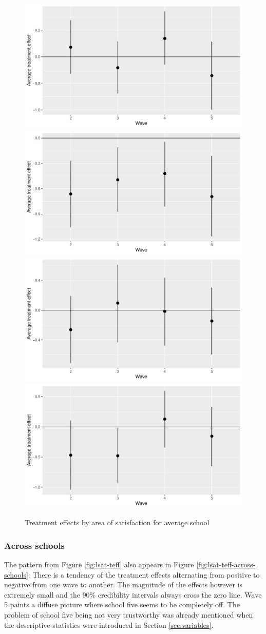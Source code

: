 \documentclass[a4, 12pt]{article}
\begin{document}
\begin{figure}
\includegraphics[width=0.5\linewidth]{../figures/lsat_teff} \includegraphics[width=0.5\linewidth]{../figures/sat_friends_teff} \includegraphics[width=0.5\linewidth]{../figures/sat_class_teff} \includegraphics[width=0.5\linewidth]{../figures/sat_school_teff} \caption{Treatment effects by area of satisfaction for average school}\label{fig:sat-teff}
\end{figure}

\hypertarget{across-schools}{%
\subsubsection{Across schools}\label{across-schools}}

The pattern from Figure \ref{fig:lsat-teff} also appears in Figure \ref{fig:lsat-teff-across-schools}: There is a tendency of the treatment effects alternating from positive to negative from one wave to another. The magnitude of the effects however is extremely small and the 90\% credibility intervals always cross the zero line. Wave 5 paints a diffuse picture where school five seems to be completely off. The problem of school five being not very trustworthy was already mentioned when the descriptive statistics were introduced in Section \ref{sec:variables}.
\end{document}
